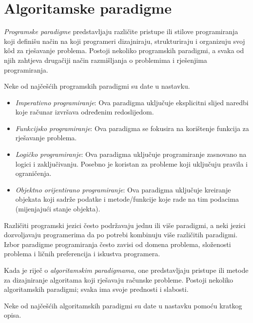 \chapter{Algoritamske paradigme}

\textit{Programske paradigme} predstavljaju različite pristupe ili stilove  programiranja koji definišu način na koji programeri dizajniraju, strukturiraju i organizuju  svoj k\^od za rješavanje problema. Postoji nekoliko programskih paradigmi, a svaka od njih zahtjeva  drugačiji način razmišljanja o problemima i rješenjima programiranja.

Neke od najčešćih programskih paradigmi su date u nastavku. 

\begin{itemize}
	\item \textit{Imperativno programiranje}: Ova paradigma uključuje %
	 eksplicitni slijed naredbi koje računar izvršava određenim redoslijedom.
	\item \textit{Funkcijsko programiranje}: Ova paradigma se fokusira na korištenje funkcija za rješavanje problema.  %
	\item \textit{Logičko programiranje}: Ova paradigma uključuje programiranje zasnovano na logici i zaključivanju. Posebno je koristan za probleme koji uključuju pravila i ograničenja.
	\item \textit{Objektno orijentirano programiranje}: Ova paradigma uključuje kreiranje objekata koji sadrže  podatke i metode/funkcije koje rade na tim podacima (mijenjajući stanje objekta).
\end{itemize}


Različiti programski jezici često podržavaju jednu ili više paradigmi, a neki jezici dozvoljavaju programerima da po potrebi kombinuju  više različitih  paradigmi. Izbor paradigme programiranja često zavisi od domena problema, složenosti problema i ličnih preferencija i iskustva programera.

Kada je riječ o \textit{algoritamskim paradigmama}, one predstavljaju  pristupe ili metode za dizajniranje algoritama koji rješavaju   računske probleme. Postoji nekoliko algoritamskih paradigmi; svaka  ima svoje prednosti i slabosti. 

Neke od najčešćih algoritamskih paradigmi su date u nastavku pomoću kratkog opisa. 

